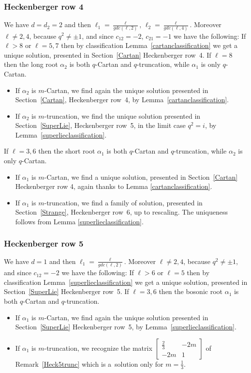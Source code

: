 \documentclass[pdftex]{sigma}%
\numberwithin{equation}{section}
\begin{document}
\subsubsection*{Heckenberger row 4}
We have $d=d_2=2$ and then $\ell_1 = \frac{\ell}{gdc(\ell,2)}$, $\ell_2 = \frac{\ell}{gdc(\ell,4)}$. Moreover $\ell \neq 2,4$, because $q^2 \neq \pm 1$, and since $c_{12}=-2$, $c_{21}=-1$ we have the following:
If $\ell > 8$ or $\ell=5,7$ then by classification Lemma~\ref{cartanclassification} we get a unique solution, presented in Section~\ref{Cartan} Heckenberger row~4.
If $\ell = 8$ then the long root $\alpha_2$ is both $q$-Cartan and $q$-truncation, while $\alpha_1$ is only $q$-Cartan.
\begin{itemize}\itemsep=0pt
	\item If $\alpha_2$ is $m$-Cartan, we find again the unique solution presented in Section~\ref{Cartan}, Heckenberger row~4, by Lemma~\ref{cartanclassification}.
	\item If $\alpha_2$ is $m$-truncation, we find the unique solution presented in Section~\ref{SuperLie}, Heckenberger row~5, in the limit case $q^2=i$, by Lemma~\ref{superlieclassification}.
	
\end{itemize}
If $\ell = 3,6$ then the short root $\alpha_1$ is both $q$-Cartan and $q$-truncation, while $\alpha_2$ is only $q$-Cartan.
\begin{itemize}\itemsep=0pt
	\item If $\alpha_1$ is $m$-Cartan, we find a unique solution, presented in Section~\ref{Cartan} Heckenberger row 4, again thanks to Lemma \ref{cartanclassification}.
	\item If $\alpha_1$ is $m$-truncation, we find a family of solution, presented in Section~\ref{Strange}, Heckenberger row~6, up to rescaling. The uniqueness follows from Lemma \ref{superlieclassification}.
\end{itemize}
\subsubsection*{Heckenberger row 5} We have $d=1$ and then $\ell_1 = \frac{\ell}{gdc(\ell,2)}$. Moreover $\ell \neq 2,4$, because $q^2 \neq \pm 1$, and since $c_{12}=-2$ we have the following: If $\ell > 6 $ or $\ell = 5$ then by classification Lemma~\ref{superlieclassification} we get a unique solution, presented in Section~\ref{SuperLie} Heckenberger row~5.
If $\ell = 3, 6$ then the bosonic root $\alpha_1$ is both $q$-Cartan and $q$-truncation.
\begin{itemize}\itemsep=0pt
	\item If $\alpha_1$ is $m$-Cartan, we find again the unique solution presented in Section~\ref{SuperLie} Heckenberger row~5, by Lemma~\ref{superlieclassification}.
	\item If $\alpha_1$ is $m$-truncation, we recognize the matrix $\left[\begin{smallmatrix}
 \frac{2}{3} & -2m\\
 -2m & 1
\end{smallmatrix} \right]$
of Remark~\ref{Heck5trunc} which is a~solution only for $m=\frac{1}{3}$.
\end{itemize}
\end{document}
